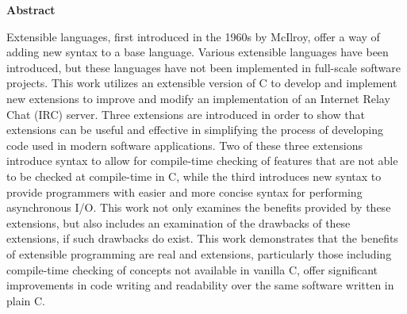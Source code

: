 \documentclass[main.tex]{subfiles}
\begin{document}
\begin{center}\textbf{Abstract}\end{center}
Extensible languages, first introduced in the 1960s by McIlroy, offer a way of adding new syntax to a base language.
Various extensible languages have been introduced, but these languages have not been implemented in full-scale
software projects. This work utilizes an extensible version of C to develop and implement new extensions to improve
and modify an implementation of an Internet Relay Chat (IRC) server. Three extensions are introduced in order to
show that extensions can be useful and effective in simplifying the process of developing code used in modern
software applications. Two of these three extensions introduce syntax to allow for compile-time checking of features
that are not able to be checked at compile-time in C, while the third introduces new syntax to provide programmers
with easier and more concise syntax for performing asynchronous I/O. This work not only examines the benefits
provided by these extensions, but also includes an examination of the drawbacks of these extensions, if such
drawbacks do exist. This work demonstrates that the benefits of extensible programming are real and extensions,
particularly those including compile-time checking of concepts not available in vanilla C, offer significant improvements
in code writing and readability over the same software written in plain C.
\end{document}
